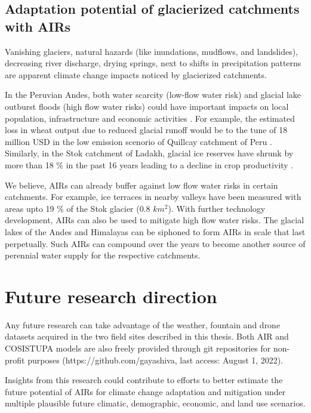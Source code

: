 \subsection{Adaptation potential of glacierized catchments with AIRs}

Vanishing glaciers, natural hazards (like inundations, mudflows, and landslides), decreasing river discharge,
drying springs, next to shifts in precipitation patterns are apparent climate change impacts noticed by
glacierized catchments.

In the Peruvian Andes, both water scarcity (low-flow water risk) and glacial lake outburst floods (high flow
water risks) could have important impacts on local population, infrastructure and economic activities
\citep{motschmannIntegratedAssessmentsWater2020}. For example, the estimated loss in wheat output due to reduced
glacial runoff would be to the tune of 18 million USD in the low emission scenorio of Quillcay catchment of Peru
\citep{motschmannCurrentFutureWater2022}. Similarly, in the Stok catchment of Ladakh, glacial ice reserves have
shrunk by more than 18 \% in the past 16 years  leading to a decline in crop productivity
\citep{sohebSpatiotemporalQuantificationKey2022}. 

We believe, AIRs can already buffer against low flow water risks in certain catchments. For example, ice
terraces in nearby valleys have been measured with areas upto 19 \% of the Stok glacier (0.8 $km^2$). With further technology
development, AIRs can also be used to mitigate high flow water risks. The glacial lakes of the Andes and
Himalayas can be siphoned to form AIRs in scale that last perpetually. Such AIRs can compound over the years to
become another source of perennial water supply for the respective catchments.

\section{Future research direction}


Any future research can take advantage of the weather, fountain and drone datasets acquired in the two field
sites described in this thesis. Both AIR and COSISTUPA models are also freely provided through git repositories
for non-profit purposes (https://github.com/gayashiva, last access: August 1, 2022).

Insights from this research could contribute to efforts to better estimate the future potential of AIRs for
climate change adaptation and mitigation under multiple plausible future climatic, demographic, economic, and
land use scenarios. 

